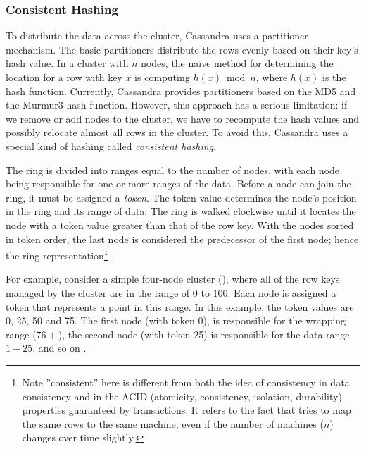 \subsubsection{Consistent Hashing}

To distribute the data across the cluster, Cassandra uses a partitioner mechanism. The basic partitioners distribute the rows evenly based on their key's hash value. In a cluster with $n$ nodes, the na\"ive method for determining the location for a row with key $x$ is computing $ h(x) \bmod n $, where $h(x)$ is the hash function. Currently, Cassandra provides partitioners based on the MD5 and the Murmur3 hash function. However, this approach has a serious limitation: if we remove or add nodes to the cluster, we have to recompute the hash values and possibly relocate almost all rows in the cluster. To avoid this, Cassandra uses a special kind of hashing called \textit{consistent hashing}.

The ring is divided into ranges equal to the number of nodes, with each node being responsible for one or more ranges of the data. Before a node can join the ring, it must be assigned a \textit{token}. The token value determines the node's position in the ring and its range of data. The ring is walked clockwise until it locates the node with a token value greater than that of the row key. %
With the nodes sorted in token order, the last node is considered the predecessor of the first node; hence the ring representation\footnote{Note ''consistent'' here is different from both the idea of consistency in data consistency and in the ACID (atomicity, consistency, isolation, durability) properties guaranteed by transactions. It refers to the fact that tries to map the same rows to the same machine, even if the number of machines ($n$) changes over time slightly.} \cite{CassandraPartitioning}.

For example, consider a simple four-node cluster (), where all of the row keys managed by the cluster are in the range of 0 to 100. Each node is assigned a token that represents a point in this range. In this example, the token values are 0, 25, 50 and 75. The first node (with token 0), is responsible for the wrapping range ($76+$), the second node (with token 25) is responsible for the data range $1-25$, and so on %
\cite{CassandraPartitioning}.

